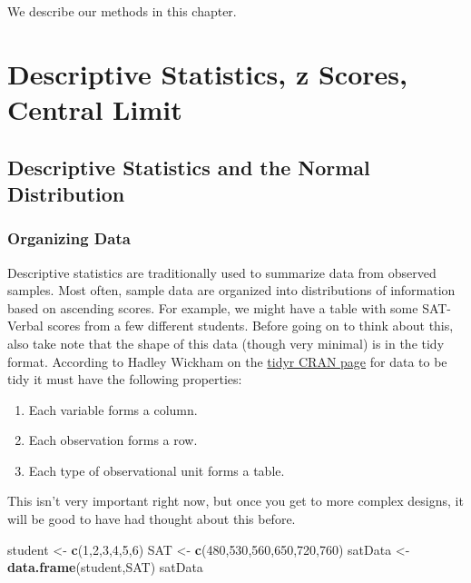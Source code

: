 \documentclass[]{book}
\newenvironment{Shaded}{\begin{snugshade}}{\end{snugshade}}
\newcommand{\KeywordTok}[1]{\textcolor[rgb]{0.13,0.29,0.53}{\textbf{#1}}}
\newcommand{\DecValTok}[1]{\textcolor[rgb]{0.00,0.00,0.81}{#1}}
\newcommand{\StringTok}[1]{\textcolor[rgb]{0.31,0.60,0.02}{#1}}
\newcommand{\NormalTok}[1]{#1}
\providecommand{\tightlist}{%
  \setlength{\itemsep}{0pt}\setlength{\parskip}{0pt}}
\theoremstyle{definition}
\theoremstyle{definition}
\theoremstyle{definition}
\theoremstyle{remark}
\begin{document}
We describe our methods in this chapter.

\chapter{Descriptive Statistics, z Scores, Central
Limit}\label{descriptive-statistics-z-scores-central-limit}

\section{Descriptive Statistics and the Normal
Distribution}\label{descriptive-statistics-and-the-normal-distribution}

\subsection{Organizing Data}\label{organizing-data}

Descriptive statistics are traditionally used to summarize data from
observed samples. Most often, sample data are organized into
distributions of information based on ascending scores. For example, we
might have a table with some SAT-Verbal scores from a few different
students. Before going on to think about this, also take note that the
shape of this data (though very minimal) is in the tidy format.
According to Hadley Wickham on the
\href{https://cran.r-project.org/web/packages/tidyr/vignettes/tidy-data.html}{tidyr
CRAN page} for data to be tidy it must have the following properties:

\begin{enumerate}
\def\labelenumi{\arabic{enumi}.}
\tightlist
\item
  Each variable forms a column.
\item
  Each observation forms a row.
\item
  Each type of observational unit forms a table.
\end{enumerate}

This isn't very important right now, but once you get to more complex
designs, it will be good to have had thought about this before.

\begin{Shaded}
\begin{Highlighting}[]
\NormalTok{student <-}\StringTok{ }\KeywordTok{c}\NormalTok{(}\DecValTok{1}\NormalTok{,}\DecValTok{2}\NormalTok{,}\DecValTok{3}\NormalTok{,}\DecValTok{4}\NormalTok{,}\DecValTok{5}\NormalTok{,}\DecValTok{6}\NormalTok{)}
\NormalTok{SAT <-}\StringTok{ }\KeywordTok{c}\NormalTok{(}\DecValTok{480}\NormalTok{,}\DecValTok{530}\NormalTok{,}\DecValTok{560}\NormalTok{,}\DecValTok{650}\NormalTok{,}\DecValTok{720}\NormalTok{,}\DecValTok{760}\NormalTok{)}
\NormalTok{satData <-}\StringTok{ }\KeywordTok{data.frame}\NormalTok{(student,SAT)}
\NormalTok{satData}
\end{Highlighting}
\end{Shaded}
\end{document}
